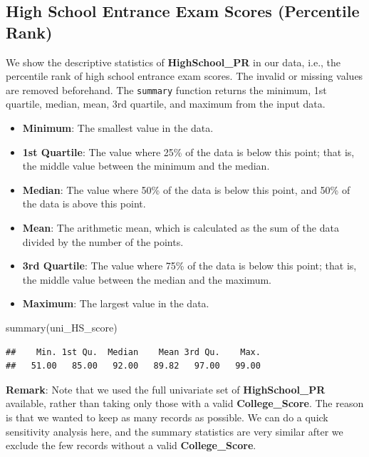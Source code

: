 \documentclass[
]{article}
\newenvironment{Shaded}{\begin{snugshade}}{\end{snugshade}}
\newcommand{\FunctionTok}[1]{\textcolor[rgb]{0.00,0.00,0.00}{#1}}
\newcommand{\NormalTok}[1]{#1}
\providecommand{\tightlist}{%
  \setlength{\itemsep}{0pt}\setlength{\parskip}{0pt}}
\begin{document}
\hypertarget{high-school-entrance-exam-scores-percentile-rank}{%
\subsection{High School Entrance Exam Scores (Percentile
Rank)}\label{high-school-entrance-exam-scores-percentile-rank}}

We show the descriptive statistics of \textbf{HighSchool\_PR} in our
data, i.e., the percentile rank of high school entrance exam scores. The
invalid or missing values are removed beforehand. The \texttt{summary}
function returns the minimum, 1st quartile, median, mean, 3rd quartile,
and maximum from the input data.

\begin{itemize}
\tightlist
\item
  \textbf{Minimum}: The smallest value in the data.
\item
  \textbf{1st Quartile}: The value where 25\% of the data is below this
  point; that is, the middle value between the minimum and the median.
\item
  \textbf{Median}: The value where 50\% of the data is below this point,
  and 50\% of the data is above this point.
\item
  \textbf{Mean}: The arithmetic mean, which is calculated as the sum of
  the data divided by the number of the points.
\item
  \textbf{3rd Quartile}: The value where 75\% of the data is below this
  point; that is, the middle value between the median and the maximum.
\item
  \textbf{Maximum}: The largest value in the data.
\end{itemize}

\begin{Shaded}
\begin{Highlighting}[]
\FunctionTok{summary}\NormalTok{(uni\_HS\_score)}
\end{Highlighting}
\end{Shaded}

\begin{verbatim}
##    Min. 1st Qu.  Median    Mean 3rd Qu.    Max. 
##   51.00   85.00   92.00   89.82   97.00   99.00
\end{verbatim}

\textbf{Remark}: Note that we used the full univariate set of
\textbf{HighSchool\_PR} available, rather than taking only those with a
valid \textbf{College\_Score}. The reason is that we wanted to keep as
many records as possible. We can do a quick sensitivity analysis here,
and the summary statistics are very similar after we exclude the few
records without a valid \textbf{College\_Score}.
\end{document}
